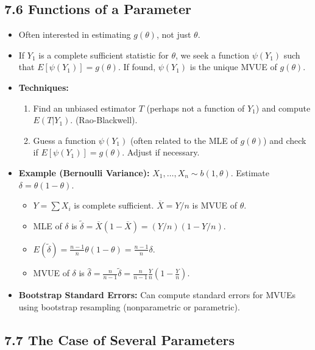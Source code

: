 \subsection{7.6 Functions of a Parameter}

\begin{itemize}
	\item Often interested in estimating $g(\theta)$, not just $\theta$.
	\item If $Y_1$ is a complete sufficient statistic for $\theta$, we seek a function $\psi(Y_1)$ such that $E[\psi(Y_1)] = g(\theta)$. If found, $\psi(Y_1)$ is the unique MVUE of $g(\theta)$.
	\item \textbf{Techniques:}
	\begin{enumerate}
		\item Find an unbiased estimator $T$ (perhaps not a function of $Y_1$) and compute $E(T|Y_1)$. (Rao-Blackwell).
		\item Guess a function $\psi(Y_1)$ (often related to the MLE of $g(\theta)$) and check if $E[\psi(Y_1)] = g(\theta)$. Adjust if necessary.
	\end{enumerate}
	\item \textbf{Example (Bernoulli Variance):} $X_1, \dots, X_n \sim b(1, \theta)$. Estimate $\delta = \theta(1-\theta)$.
	\begin{itemize}
		\item $Y = \sum X_i$ is complete sufficient. $\overline{X} = Y/n$ is MVUE of $\theta$.
		\item MLE of $\delta$ is $\widetilde{\delta} = \overline{X}(1-\overline{X}) = (Y/n)(1 - Y/n)$.
		\item $E(\widetilde{\delta}) = \frac{n-1}{n} \theta(1-\theta) = \frac{n-1}{n} \delta$.
		\item MVUE of $\delta$ is $\widehat{\delta} = \frac{n}{n-1}\widetilde{\delta} = \frac{n}{n-1} \frac{Y}{n} (1 - \frac{Y}{n})$.
	\end{itemize}
	\item \textbf{Bootstrap Standard Errors:} Can compute standard errors for MVUEs using bootstrap resampling (nonparametric or parametric).
\end{itemize}

\subsection{7.7 The Case of Several Parameters}

